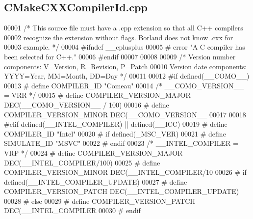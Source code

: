 \subsection{C\+Make\+C\+X\+X\+Compiler\+Id.\+cpp}
\label{gr-radar-dev_2build_2CMakeFiles_23_85_81_2CompilerIdCXX_2CMakeCXXCompilerId_8cpp_source}

\begin{DoxyCode}
00001 \textcolor{comment}{/* This source file must have a .cpp extension so that all C++ compilers}
00002 \textcolor{comment}{   recognize the extension without flags.  Borland does not know .cxx for}
00003 \textcolor{comment}{   example.  */}
00004 \textcolor{preprocessor}{#ifndef \_\_cplusplus}
00005 \textcolor{preprocessor}{# error "A C compiler has been selected for C++."}
00006 \textcolor{preprocessor}{#endif}
00007 
00008 
00009 \textcolor{comment}{/* Version number components: V=Version, R=Revision, P=Patch}
00010 \textcolor{comment}{   Version date components:   YYYY=Year, MM=Month,   DD=Day  */}
00011 
00012 \textcolor{preprocessor}{#if defined(\_\_COMO\_\_)}
00013 \textcolor{preprocessor}{# define COMPILER\_ID "Comeau"}
00014   \textcolor{comment}{/* \_\_COMO\_VERSION\_\_ = VRR */}
00015 \textcolor{preprocessor}{# define COMPILER\_VERSION\_MAJOR DEC(\_\_COMO\_VERSION\_\_ / 100)}
00016 \textcolor{preprocessor}{# define COMPILER\_VERSION\_MINOR DEC(\_\_COMO\_VERSION\_\_ %
00017 
00018 \textcolor{preprocessor}{#elif defined(\_\_INTEL\_COMPILER) || defined(\_\_ICC)}
00019 \textcolor{preprocessor}{# define COMPILER\_ID "Intel"}
00020 \textcolor{preprocessor}{# if defined(\_MSC\_VER)}
00021 \textcolor{preprocessor}{#  define SIMULATE\_ID "MSVC"}
00022 \textcolor{preprocessor}{# endif}
00023   \textcolor{comment}{/* \_\_INTEL\_COMPILER = VRP */}
00024 \textcolor{preprocessor}{# define COMPILER\_VERSION\_MAJOR DEC(\_\_INTEL\_COMPILER/100)}
00025 \textcolor{preprocessor}{# define COMPILER\_VERSION\_MINOR DEC(\_\_INTEL\_COMPILER/10 %
00026 \textcolor{preprocessor}{# if defined(\_\_INTEL\_COMPILER\_UPDATE)}
00027 \textcolor{preprocessor}{#  define COMPILER\_VERSION\_PATCH DEC(\_\_INTEL\_COMPILER\_UPDATE)}
00028 \textcolor{preprocessor}{# else}
00029 \textcolor{preprocessor}{#  define COMPILER\_VERSION\_PATCH DEC(\_\_INTEL\_COMPILER   %
00030 \textcolor{preprocessor}{# endif}
}}}
\end{DoxyCode}

